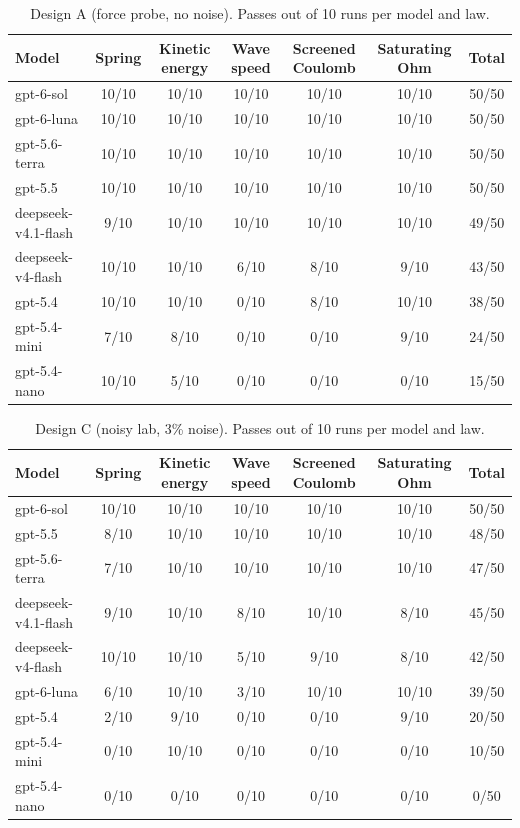 \begin{table}[h]
\centering
\small
\begin{tabular}{lcccccc}
\hline
Model & Spring & Kinetic energy & Wave speed & Screened Coulomb & Saturating Ohm & Total \\
\hline
gpt-6-sol & 10/10 & 10/10 & 10/10 & 10/10 & 10/10 & 50/50 \\
gpt-6-luna & 10/10 & 10/10 & 10/10 & 10/10 & 10/10 & 50/50 \\
gpt-5.6-terra & 10/10 & 10/10 & 10/10 & 10/10 & 10/10 & 50/50 \\
gpt-5.5 & 10/10 & 10/10 & 10/10 & 10/10 & 10/10 & 50/50 \\
deepseek-v4.1-flash & 9/10 & 10/10 & 10/10 & 10/10 & 10/10 & 49/50 \\
deepseek-v4-flash & 10/10 & 10/10 & 6/10 & 8/10 & 9/10 & 43/50 \\
gpt-5.4 & 10/10 & 10/10 & 0/10 & 8/10 & 10/10 & 38/50 \\
gpt-5.4-mini & 7/10 & 8/10 & 0/10 & 0/10 & 9/10 & 24/50 \\
gpt-5.4-nano & 10/10 & 5/10 & 0/10 & 0/10 & 0/10 & 15/50 \\
\hline
\end{tabular}
\caption{Design A (force probe, no noise). Passes out of 10 runs per model and law.}
\label{tab:designA}
\end{table}
\begin{table}[h]
\centering
\small
\begin{tabular}{lcccccc}
\hline
Model & Spring & Kinetic energy & Wave speed & Screened Coulomb & Saturating Ohm & Total \\
\hline
gpt-6-sol & 10/10 & 10/10 & 10/10 & 10/10 & 10/10 & 50/50 \\
gpt-5.5 & 8/10 & 10/10 & 10/10 & 10/10 & 10/10 & 48/50 \\
gpt-5.6-terra & 7/10 & 10/10 & 10/10 & 10/10 & 10/10 & 47/50 \\
deepseek-v4.1-flash & 9/10 & 10/10 & 8/10 & 10/10 & 8/10 & 45/50 \\
deepseek-v4-flash & 10/10 & 10/10 & 5/10 & 9/10 & 8/10 & 42/50 \\
gpt-6-luna & 6/10 & 10/10 & 3/10 & 10/10 & 10/10 & 39/50 \\
gpt-5.4 & 2/10 & 9/10 & 0/10 & 0/10 & 9/10 & 20/50 \\
gpt-5.4-mini & 0/10 & 10/10 & 0/10 & 0/10 & 0/10 & 10/50 \\
gpt-5.4-nano & 0/10 & 0/10 & 0/10 & 0/10 & 0/10 & 0/50 \\
\hline
\end{tabular}
\caption{Design C (noisy lab, 3\% noise). Passes out of 10 runs per model and law.}
\label{tab:designC}
\end{table}

